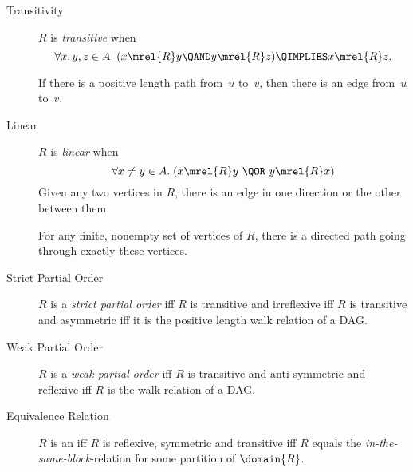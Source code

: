 \begin{description}
\item[Transitivity]
$R$ is \emph{transitive}
when
\[
 \forall x, y, z \in A. \; (x \mrel{R} y \QAND y \mrel{R} z) \QIMPLIES x \mrel{R} z.
\]

If there is a positive length path from~$u$ to~$v$, then there is an edge from~$u$ to~$v$.

\iffalse
For any walk $v_0, v_1, \dots, v_k$ in~$G$ where $k \ge 2$,
$\diredge{v_0}{v_k}$ is in~$G$ (and, hence, $\diredge{v_i}{v_j}$ is
also in~$G$ for all $i < j$.
\fi

\item[Linear] $R$ is \emph{linear}%
when
\[
 \forall x \neq y \in A. \; (x \mrel{R} y\ \QOR\ y \mrel{R} x)
\]
Given any two vertices in $R$, there is an edge in one direction or the
other between them.

For any finite, nonempty set of vertices of $R$, there is a directed path
going through exactly these vertices.

\item[Strict Partial Order] $R$ is a \emph{strict partial order}%
iff $R$ is transitive and irreflexive iff $R$ is transitive and
  asymmetric iff it is the positive length walk relation of a DAG.
  
\item[Weak Partial Order] $R$ is a \emph{weak partial order}%
iff $R$ is transitive and anti-symmetric and reflexive iff $R$ is the walk
  relation of a DAG.

\item[Equivalence Relation] $R$ is an \emph{} iff $R$
  is reflexive, symmetric and transitive iff $R$ equals the
  \emph{in-the-same-block}-relation for some partition of $\domain{R}$.

\end{description}

\endinput

